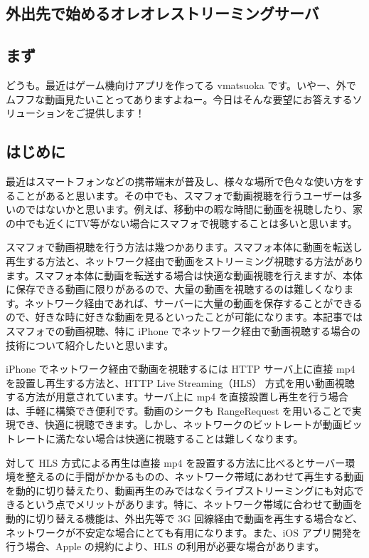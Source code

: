 \subsection{外出先で始めるオレオレストリーミングサーバ}

\subsection{まず}
 どうも。最近はゲーム機向けアプリを作ってる vmatsuoka です。いやー、外でムフフな動画見たいことってありますよねー。今日はそんな要望にお答えするソリューションをご提供します！

\subsection{はじめに}
 最近はスマートフォンなどの携帯端末が普及し、様々な場所で色々な使い方をすることがあると思います。その中でも、スマフォで動画視聴を行うユーザーは多いのではないかと思います。例えば、移動中の暇な時間に動画を視聴したり、家の中でも近くにTV等がない場合にスマフォで視聴することは多いと思います。

 スマフォで動画視聴を行う方法は幾つかあります。スマフォ本体に動画を転送し再生する方法と、ネットワーク経由で動画をストリーミング視聴する方法があります。スマフォ本体に動画を転送する場合は快適な動画視聴を行えますが、本体に保存できる動画に限りがあるので、大量の動画を視聴するのは難しくなります。ネットワーク経由であれば、サーバーに大量の動画を保存することができるので、好きな時に好きな動画を見るといったことが可能になります。本記事ではスマフォでの動画視聴、特に iPhone でネットワーク経由で動画視聴する場合の技術について紹介したいと思います。

 iPhone でネットワーク経由で動画を視聴するには HTTP サーバ上に直接 mp4 を設置し再生する方法と、HTTP Live Streaming（HLS） 方式を用い動画視聴する方法が用意されています。サーバ上に mp4 を直接設置し再生を行う場合は、手軽に構築でき便利です。動画のシークも RangeRequest を用いることで実現でき、快適に視聴できます。しかし、ネットワークのビットレートが動画ビットレートに満たない場合は快適に視聴することは難しくなります。

 対して HLS 方式による再生は直接 mp4 を設置する方法に比べるとサーバー環境を整えるのに手間がかかるものの、ネットワーク帯域にあわせて再生する動画を動的に切り替えたり、動画再生のみではなくライブストリーミングにも対応できるという点でメリットがあります。特に、ネットワーク帯域に合わせて動画を動的に切り替える機能は、外出先等で 3G 回線経由で動画を再生する場合など、ネットワークが不安定な場合にとても有用になります。また、iOS アプリ開発を行う場合、Apple の規約により、HLS の利用が必要な場合があります。

